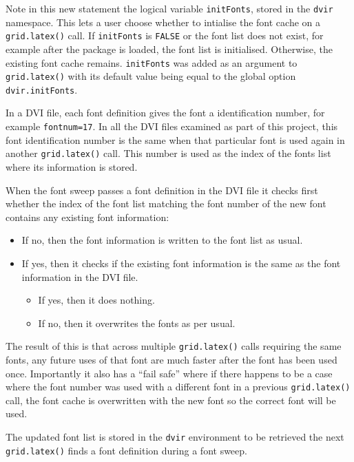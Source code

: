 \documentclass[]{article}
\begin{document}
Note in this new statement the logical variable \texttt{initFonts},
stored in the \texttt{dvir} namespace. This lets a user choose whether
to intialise the font cache on a \texttt{grid.latex()} call. If
\texttt{initFonts} is \texttt{FALSE} or the font list does not exist,
for example after the package is loaded, the font list is initialised.
Otherwise, the existing font cache remains. \texttt{initFonts} was added
as an argument to \texttt{grid.latex()} with its default value being
equal to the global option \texttt{dvir.initFonts}.

In a DVI file, each font definition gives the font a identification
number, for example \texttt{fontnum=17}. In all the DVI files examined
as part of this project, this font identification number is the same
when that particular font is used again in another \texttt{grid.latex()}
call. This number is used as the index of the fonts list where its
information is stored.

When the font sweep passes a font definition in the DVI file it checks
first whether the index of the font list matching the font number of the
new font contains any existing font information:

\begin{itemize}
  \item If no, then the font information is written to the font list as usual.
  \item If yes, then it checks if the existing font information is the same as the font information in the DVI file. 
  \begin{itemize}
    \item If yes, then it does nothing. 
    \item If no, then it overwrites the fonts as per usual.
  \end{itemize}
\end{itemize}

The result of this is that across multiple \texttt{grid.latex()} calls
requiring the same fonts, any future uses of that font are much faster
after the font has been used once. Importantly it also has a ``fail
safe'' where if there happens to be a case where the font number was
used with a different font in a previous \texttt{grid.latex()} call, the
font cache is overwritten with the new font so the correct font will be
used.

The updated font list is stored in the \texttt{dvir} environment to be
retrieved the next \texttt{grid.latex()} finds a font definition during
a font sweep.
\end{document}

